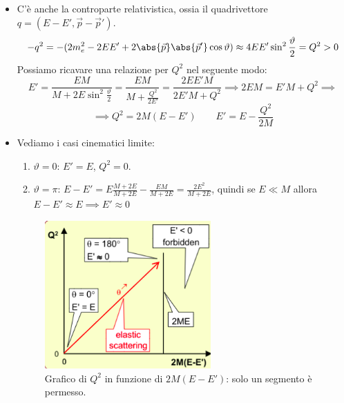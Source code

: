 \begin{itemize}
    \item C'è anche la controparte relativistica, ossia il quadrivettore $q=(E-E',\vec p-\vec p')$. 
    \begin{equation*}
    -q^2=-(2m_e^2-2EE'+2\abs{\vec p}\abs{\vec p'}\cos\vartheta)\approx4EE'\sin^2\frac\vartheta2=Q^2>0
    \end{equation*}
    Possiamo ricavare una relazione per $Q^2$ nel seguente modo:
    \begin{equation*}
        E'=\frac{EM}{M+2E\sin^2\frac\vartheta2}=\frac{EM}{M+\frac{Q^2}{2E'}}=\frac{2EE'M}{2E'M+Q^2}\implies 2EM=E'M+Q^2\implies
    \end{equation*}
    \begin{equation*}
        \implies Q^2=2M(E-E')\qquad E'=E-\frac{Q^2}{2M}
    \end{equation*}
    \item Vediamo i casi cinematici limite:
    \begin{enumerate}
        \item $\vartheta=0$: $E'=E$, $Q^2=0$.
        \item $\vartheta=\pi$: $E-E'=E\frac{M+2E}{M+2E}-\frac{EM}{M+2E}=\frac{2E^2}{M+2E}$, quindi se $E\ll M$ allora $E-E'\approx E\implies E'\approx0$ 
    \end{enumerate}
    \begin{figure}[H]
        \centering
        \includegraphics[width=0.6\textwidth]{immagini/fig_q_2_elastic.png}
        \caption{Grafico di $Q^2$ in funzione di $2M(E-E')$: solo un segmento è permesso.}
    \end{figure}
\end{itemize}
